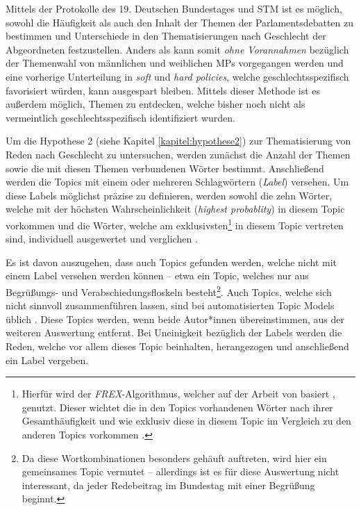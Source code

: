 \documentclass[12pt, 
    twoside=false, 
    bibliography=totoc, 
    numbers=endperiod, 
    headings=normal, 
    toc=chapterentrydotfill
    ]{scrbook}
\begin{document}
Mittels der Protokolle des 19. Deutschen Bundestages und STM ist es möglich, sowohl die Häufigkeit als auch den Inhalt der Themen der Parlamentsdebatten zu bestimmen und Unterschiede in den Thematisierungen nach Geschlecht der Abgeordneten festzustellen. Anders als \textcite{back_2014} kann somit \emph{ohne Vorannahmen} bezüglich der Themenwahl von männlichen und weiblichen MPs vorgegangen werden und eine vorherige Unterteilung in \emph{soft} und \emph{hard policies}, welche geschlechtsspezifisch favorisiert würden, kann ausgespart bleiben. Mittels dieser Methode ist es außerdem möglich, Themen zu entdecken, welche bisher noch nicht als vermeintlich geschlechtsspezifisch identifiziert wurden.

Um die Hypothese 2 (siehe Kapitel \ref{kapitel:hypothese2}) zur Thematisierung von Reden nach Geschlecht zu untersuchen, werden zunächst die Anzahl der Themen sowie die mit diesen Themen verbundenen Wörter bestimmt. Anschließend werden die Topics mit einem oder mehreren Schlagwörtern (\emph{Label}) versehen. Um diese Labels möglichst präzise zu definieren, werden sowohl die zehn Wörter, welche mit der höchsten Wahrscheinlichkeit (\emph{highest probablity}) in diesem Topic vorkommen und die Wörter, welche am exklusivsten\footnote{Hierfür wird der \emph{FREX}-Algorithmus, welcher auf der Arbeit von \textcite{airoldi_2016} basiert \parencite[12]{roberts_2018}, genutzt. Dieser wichtet die in den Topics vorhandenen Wörter nach ihrer Gesamthäufigkeit und wie exklusiv diese in diesem Topic im Vergleich zu den anderen Topics vorkommen \parencite[13f.]{roberts_2018}.} in diesem Topic vertreten sind, individuell ausgewertet und verglichen \parencite[13f.]{roberts_2018}. 

Es ist davon auszugehen, dass auch Topics gefunden werden, welche nicht mit einem Label versehen werden können -- etwa ein Topic, welches nur aus Begrüßungs- und Verabschiedungsfloskeln besteht\footnote{Da diese Wortkombinationen besonders gehäuft auftreten, wird hier ein gemeinsames Topic vermutet -- allerdings ist es für diese Auswertung nicht interessant, da jeder Redebeitrag im Bundestag mit einer Begrüßung beginnt.}. Auch Topics, welche sich nicht sinnvoll zusammenführen lassen, sind bei automatisierten Topic Models üblich \parencites[262]{mimno_2011}[11]{grajzl_2018}. Diese Topics werden, wenn beide Autor*innen übereinstimmen, aus der weiteren Auswertung entfernt. Bei Uneinigkeit bezüglich der Labels werden die Reden, welche vor allem dieses Topic beinhalten, herangezogen und anschließend ein Label vergeben.
\end{document}
